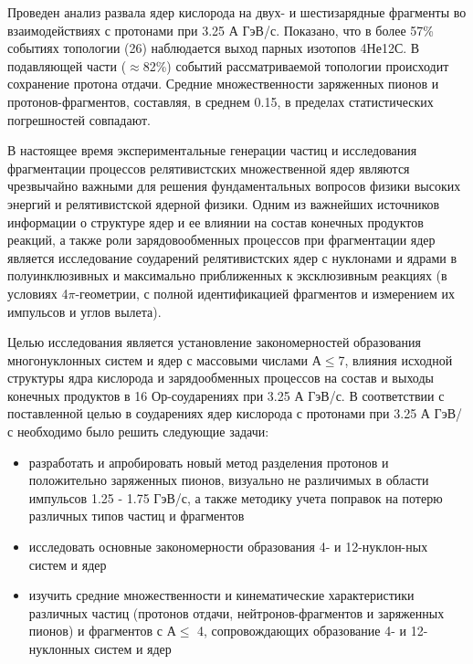 \documentclass[fontsize=14pt]{scrarticle}
\begin{document}
   Проведен анализ развала ядер кислорода на двух- и шестизарядные фрагменты во взаимодействиях с протонами при 3.25 А ГэВ/с. Показано, что в более 57\% событиях топологии (26) наблюдается выход парных изотопов 4Не12С. В подавляющей части ($\approx$82\%) событий рассматриваемой топологии происходит сохранение протона отдачи. Средние множественности заряженных пионов и протонов-фрагментов, составляя, в среднем 0.15, в пределах статистических погрешностей совпадают. 
   
   В настоящее время экспериментальные генерации частиц и исследования     фрагментации процессов релятивистских множественной ядер являются чрезвычайно важными для решения фундаментальных вопросов физики  высоких энергий и релятивистской ядерной физики. Одним из важнейших источников информации о структуре ядер и ее влиянии на состав конечных продуктов реакций, а также роли зарядовообменных процессов при фрагментации ядер является исследование соударений релятивистских ядер с нуклонами и ядрами в полуинклюзивных и максимально приближенных к эксклюзивным реакциях (в условиях 4$\pi$-геометрии, с полной идентификацией фрагментов и измерением их импульсов и углов вылета). 
   
   Целью исследования является установление закономерностей образования многонуклонных систем и ядер с массовыми числами А$\le$7, влияния исходной структуры ядра кислорода и зарядообменных процессов на состав и выходы конечных продуктов в 16 Ор-соударениях при 3.25 А ГэВ/с. В соответствии с поставленной целью в соударениях ядер кислорода с протонами при 3.25 А ГэВ/с необходимо было решить следующие задачи:
\begin{itemize}
    \item разработать и апробировать новый метод разделения протонов и положительно заряженных пионов, визуально не различимых в области импульсов 1.25 - 1.75 ГэВ/с, а также методику учета поправок на потерю различных типов частиц и фрагментов
    \item исследовать основные закономерности образования 4- и 12-нуклон-ных систем и ядер
    \item изучить средние множественности и кинематические характеристики различных частиц (протонов отдачи, нейтронов-фрагментов и заряженных пионов) и фрагментов с А$\le$ 4, сопровождающих образование 4- и 12- нуклонных систем и ядер
    \end{itemize}
    

	
	\newpage	
	\tableofcontents
	\setcounter{page}{3}
	\newpage
	
\end{document}
